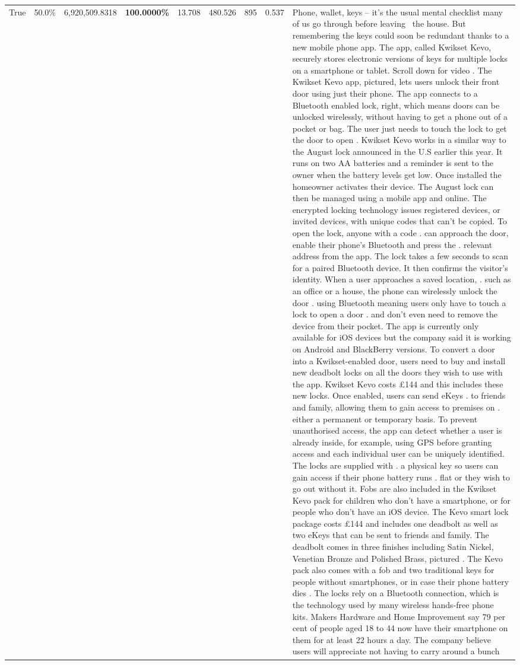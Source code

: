 \begin{table}[H]
\begin{tabular}{lllrlllll}
True & 50.0\% & 6,920,509.8318 & \bfseries \color{red} 100.0000\% & 13.708 & 480.526 & 895 & 0.537 & Phone, wallet, keys – it’s the usual mental checklist many of us go through before leaving  the house. But remembering the keys could soon be redundant thanks to a new mobile phone app. The app, called Kwikset Kevo, securely stores electronic versions of keys for multiple locks on a smartphone or tablet. Scroll down for video . The Kwikset Kevo app, pictured, lets users unlock their front door using just their phone. The app connects to a Bluetooth enabled lock, right, which means doors can be unlocked wirelessly, without having to get a phone out of a pocket or bag. The user just needs to touch the lock to get the door to open . Kwikset Kevo works in a similar way to the August lock announced in the U.S earlier this year. It runs on two AA batteries and a reminder is sent to the owner when the battery levels get low. Once installed the homeowner activates their device. The August lock can then be managed using a mobile app and online. The encrypted locking technology issues registered devices, or invited devices, with unique codes that can't be copied. To open the lock, anyone with a code . can approach the door, enable their phone's Bluetooth and press the . relevant address from the app. The lock takes a few seconds to scan for a paired Bluetooth device. It then confirms the visitor's identity. When a user approaches a saved location, . such as an office or a house, the phone can wirelessly unlock the door . using Bluetooth meaning users only have to touch a lock to open a door . and don't even need to remove the device from their pocket. The app is currently only available for iOS devices but the company said it is working on Android and BlackBerry versions. To convert a door into a Kwikset-enabled door, users need to buy and install new deadbolt locks on all the doors they wish to use with the app. Kwikset Kevo costs £144 and this includes these new locks. Once enabled, users can send eKeys . to friends and family, allowing them to gain access to premises on . either a permanent or temporary basis. To prevent unauthorised access, the app can detect whether a user is already inside, for example, using GPS before granting access and each individual user can be uniquely identified. The locks are supplied with . a physical key so users can gain access if their phone battery runs . flat or they wish to go out without it. Fobs are also included in the Kwikset Kevo pack for children who don't have a smartphone, or for people who don't have an iOS device. The Kevo smart lock package costs £144 and includes one deadbolt as well as two eKeys that can be sent to friends and family. The deadbolt comes in three finishes including Satin Nickel, Venetian Bronze and Polished Brass, pictured . The Kevo pack also comes with a fob and two traditional keys for people without smartphones, or in case their phone battery dies . The locks rely on a Bluetooth connection, which is the technology used by many wireless hands-free phone kits. Makers Hardware and Home Improvement say 79 per cent of people aged 18 to 44 now have their smartphone on them for at least 22 hours a day. The company believe users will appreciate not having to carry around a bunch 
\end{tabular}
\end{table}
